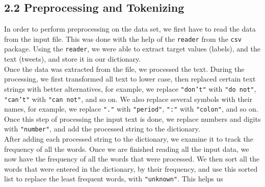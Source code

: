 
\subsection*{2.2 Preprocessing and Tokenizing}


In order to perform preprocessing on the data set, we first have to read the data from the input file. This was done with the help of the \texttt{reader} from the \texttt{csv} package. Using the \texttt{reader}, we were able to extract target values (labels), and the text (tweets), and store it in our dictionary. \\

Once the data was extracted from the file, we processed the text. During the processing, we first transformed all text to lower case, then replaced certain text strings with better alternatives, for example, we replace \texttt{"don't"} with \texttt{"do not"}, \texttt{"can't"} with \texttt{"can not"}, and so on. We also replace several symbols with their names, for example, we replace \texttt{"."} with \texttt{"period"}, \texttt{":"} with \texttt{"colon"}, and so on. Once this step of processing the input text is done, we replace numbers and digits with \texttt{"number"}, and add the processed string to the dictionary. \\

After adding each processed string to the dictionary, we examine it to track the frequency of all the words. Once we are finished reading all the input data, we now have the frequency of all the words that were processed. We then sort all the words that were entered in the dictionary, by their frequency, and use this sorted list to replace the least frequent words, with \texttt{"unknown"}. This helps us 